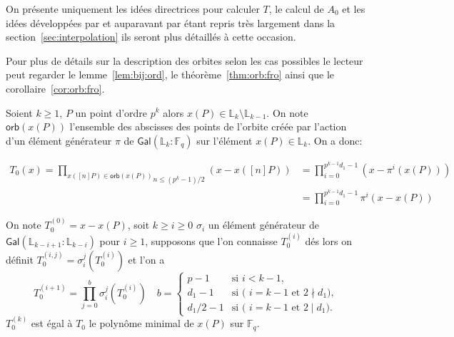 \documentclass[10pt,a4paper]{book}
\theoremstyle{plain}
\theoremstyle{definition}
\theoremstyle{definition}
\theoremstyle{definition}
\theoremstyle{definition}
\theoremstyle{definition}
\theoremstyle{remark}
\theoremstyle{remark}
\theoremstyle{definition}
\begin{document}

On présente uniquement les idées directrices pour calculer $T$, le calcul de 
$A_0$ et les idées développées par \cite{DeFeo11} et auparavant par 
\cite{EngeMorain03} étant repris très largement dans la 
section~\ref{sec:interpolation} ils seront plus détaillés à cette occasion.


Pour plus de détails sur la description des orbites selon les cas 
possibles le lecteur peut regarder le  lemme~\ref{lem:bij:ord}, le 
théorème~\ref{thm:orb:fro} ainsi que le corollaire~\ref{cor:orb:fro}.

Soient $k \geqslant 1$, $P$ un point d'ordre $p^k$ alors $x(P) \in \mathbb{L}_{k} \setminus \mathbb{L}_{k-1}$. On note $\mathsf{orb}(x(P))$ l'ensemble des abscisses des points de l'orbite créée par l'action d'un élément générateur $\pi$ de $\mathsf{Gal}(\mathbb{L}_k:\mathbb{F}_{q})$ sur l'élément $x(P) \in \mathbb{L}_k$. On a donc: 

\begin{equation*}
\begin{alignedat}{1}
T_{0}(x)= \overset{}{\underset{n \leqslant (p^k-1)/2}{\underset{x([n]P) \in \mathsf{orb}(x(P)) }{\prod }}}(x-x([n]P)) &=\prod_{i=0}^{p^{k-1}d_1-1}(x-\pi^i(x(P))) \\
&=\prod_{i=0}^{{p^{k-1}d_1-1}}\pi^i(x-x(P))
\end{alignedat}
\end{equation*}

On note $T_0^{(0)}=x-x(P)$, soit $k \geqslant i\geqslant 0$ $\sigma_i$ un élément générateur de $\mathsf{Gal}(\mathbb{L}_{k-i+1}:\mathbb{L}_{k-i})$ pour $i \geqslant 1$, supposons que l'on connaisse $T_0^{(i)}$ dés lors on définit $T_0^{(i,j)}=\sigma_i^j(T_0^{(i)})$ et l'on a 
\[
T_0^{(i+1)}=\prod_{j=0}^{b} \sigma_i^j(T_0^{(i)}) \quad  b = \begin{cases}
    p-1 &\text{si $i<k-1$,}\\
    d_1 -1  &\text{si ( $i=k-1$ et $2 \nmid d_1$),}\\
    d_1/2 - 1 &\text{si ( $i=k-1$ et $2 \mid d_1 $)}.
  \end{cases}
\]
 $T_0^{(k)}$ est égal à $T_0$ le polynôme minimal de $x(P)$ sur $\mathbb{F}_q$.
\end{document}
